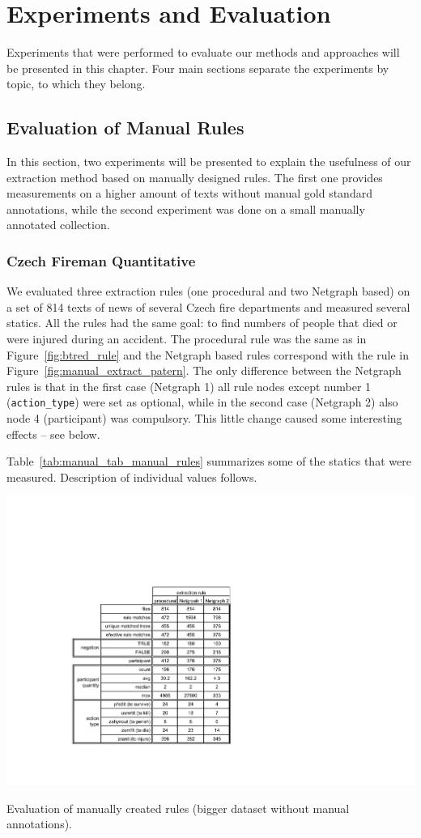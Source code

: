\chapter{Experiments and Evaluation} \label{sec:ch_eval}

Experiments that were performed to evaluate our methods and approaches will be presented in this chapter. Four main sections separate the experiments by topic, to which they belong.

\section{Evaluation of Manual Rules} \graphicspath{{../img/ch50/}}


In this section, two experiments will be presented to explain the usefulness of our extraction method based on manually designed rules. 
The first one provides measurements on a higher amount of texts without manual gold standard annotations, while the second experiment was done on a small manually annotated collection. 

\subsection{Czech Fireman Quantitative} \label{sec:manual_quant_experiment}

We evaluated three extraction rules (one procedural and two Netgraph based) on a set of 814 texts of news of several Czech fire departments and measured several statics. All the rules had the same goal: to find numbers of people that died or were injured during an accident. The procedural rule was the same as in Figure~\ref{fig:btred_rule} and the Netgraph based rules correspond with the rule in Figure~\ref{fig:manual_extract_patern}. The only difference between the Netgraph rules is that in the first case (Netgraph 1) all rule nodes except number 1 (\verb+action_type+) were set as optional, while in the second case (Netgraph 2) also node 4 (participant) was compulsory. This little change caused some interesting effects -- see below. 

Table~\ref{tab:manual_tab_manual_rules} summarizes some of the statics that were measured. Description of individual values follows.

\begin{table}[t!]
	\centering
		\includegraphics[angle=-90,width=0.75\hsize]{tab_manual_rules}
	\caption{Evaluation of manually created rules (bigger dataset without manual annotations).}
	\label{tab:manual_tab_manual_rules}
\end{table}



